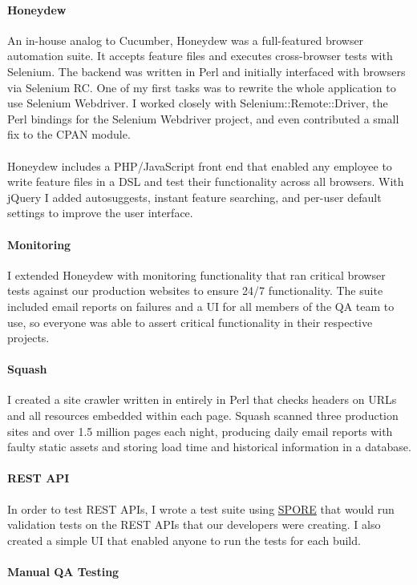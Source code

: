 \begin{position}
  \paragraph{Honeydew}
  An in-house analog to Cucumber, Honeydew was a full-featured browser
  automation suite. It accepts feature files and executes
  cross-browser tests with Selenium. The backend was written in Perl
  and initially interfaced with browsers via Selenium RC. One of my
  first tasks was to rewrite the whole application to use Selenium
  Webdriver. I worked closely with Selenium::Remote::Driver, the Perl
  bindings for the Selenium Webdriver project, and even contributed a
  small fix to the CPAN module.

  \paragraph{} Honeydew includes a PHP/JavaScript front end that enabled any
  employee to write feature files in a DSL and test their
  functionality across all browsers. With jQuery I added autosuggests,
  instant feature searching, and per-user default settings to improve
  the user interface.
  \paragraph{Monitoring}
  I extended Honeydew with monitoring functionality that ran critical
  browser tests against our production websites to ensure 24/7
  functionality. The suite included email reports on failures and a UI
  for all members of the QA team to use, so everyone was able to
  assert critical functionality in their respective projects.
  \paragraph{Squash}
  I created a site crawler written in entirely in Perl that checks
  headers on URLs and all resources embedded within each page. Squash
  scanned three production sites and over 1.5 million pages each
  night, producing daily email reports with faulty static assets and
  storing load time and historical information in a database.
  \paragraph{REST API}
  In order to test REST APIs, I wrote a test suite using
  \href{https://github.com/SPORE}{SPORE} that would run validation
  tests on the REST APIs that our developers were creating. I also
  created a simple UI that enabled anyone to run the tests for each
  build.
  \paragraph{Manual QA Testing}
\end{position}
